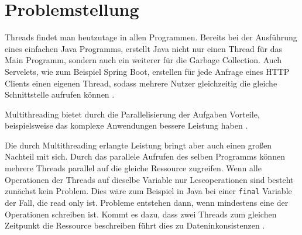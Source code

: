 \section{Problemstellung}

Threads findet man heutzutage in allen Programmen. Bereits bei der Ausführung eines einfachen Java Programms, erstellt Java nicht nur einen Thread für das Main Programm, sondern auch ein weiterer für die Garbage Collection. Auch Servelets, wie zum Beispiel Spring Boot, erstellen für jede Anfrage eines HTTP Clients einen eigenen Thread, sodass mehrere Nutzer gleichzeitig die gleiche Schnittstelle aufrufen können \cite[vgl.][8]{brian}.

Multithreading bietet durch die Parallelisierung der Aufgaben Vorteile, beispielsweise das komplexe Anwendungen bessere Leistung haben \cite[vgl.][3]{brian}. 

Die durch Multithreading erlangte Leistung bringt aber auch einen großen Nachteil mit sich. Durch das parallele Aufrufen des selben Programms können mehrere Threads parallel auf die gleiche Ressource zugreifen. Wenn alle Operationen der Threads auf dieselbe Variable nur Leseoperationen sind besteht zunächst kein Problem. Dies wäre zum Beispiel in Java  bei einer \texttt{final} Variable der Fall, die read only ist. Probleme entstehen dann, wenn mindestens eine der Operationen schreiben ist. Kommt es dazu, dass zwei Threads zum gleichen Zeitpunkt die Ressource beschreiben führt dies zu Dateninkonsistenzen \cite[vgl.][11-15]{brian}.